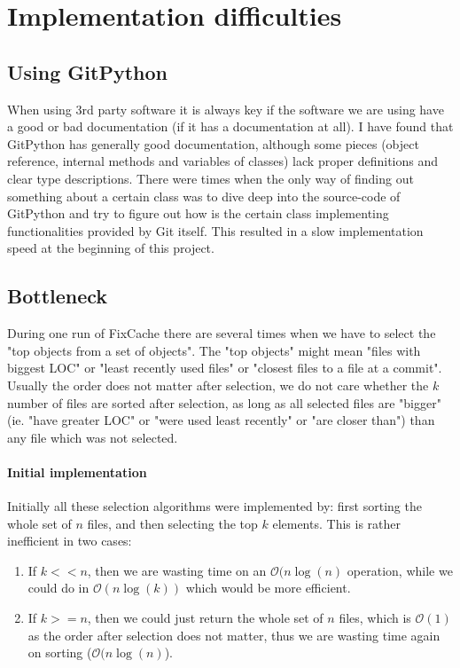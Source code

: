 \documentclass[12pt,twoside,notitlepage]{report}
\newcommand{\fxch}{FixCache }
\begin{document}
\section{Implementation difficulties}
\subsection{Using GitPython}
When using 3rd party software it is always key if the software we are using have a good or bad documentation (if it has a documentation at all). I have found that GitPython has generally good documentation, although some pieces (object reference, internal methods and variables of classes) lack proper definitions and clear type descriptions. There were times when the only way of finding out something about a certain class was to dive deep into the source-code of GitPython and try to figure out how is the certain class implementing functionalities provided by Git itself. This resulted in a slow implementation speed at the beginning of this project.
\subsection{Bottleneck}
During one run of \fxch there are several times when we have to select the "top objects from a set of objects". The "top objects" might mean "files with biggest LOC" or "least recently used files" or "closest files to a file at a commit". Usually the order does not matter after selection, we do not care whether the $k$ number of files are sorted after selection, as long as all selected files are "bigger" (ie. "have greater LOC" or "were used least recently" or "are closer than") than any file which was not selected.
\paragraph{Initial implementation}
Initially all these selection algorithms were implemented by: first sorting the whole set of $n$ files, and then selecting the top $k$ elements. This is rather inefficient in two cases:
\begin{enumerate}
\item If $k << n$, then we are wasting time on an $\mathcal{O}(n\log(n)$ operation, while we could do in $\mathcal{O}(n\log(k))$ which would be more efficient.
\item If $k >= n$, then we could just return the whole set of $n$ files, which is $\mathcal{O}(1)$ as the order after selection does not matter, thus we are wasting time again on sorting ($\mathcal{O}(n\log(n)$).
\end{enumerate}
\end{document}
